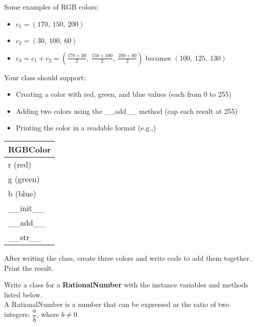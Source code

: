 		\begin{minipage}[t]{0.7\textwidth}
			Some examples of RGB colors:
			\begin{itemize}
				\item $c_1 = (170,\ 150,\ 200)$
				\item $c_2 = (30,\ 100,\ 60)$
				\item $c_3 = c_1 + c_2 = (\frac{170+30}{2},\ \frac{150+100}{2},\ \frac{200+60}{2})$ 
					becomes $(100,\ 125,\ 130)$
			\end{itemize}
		
			Your class should support:
			\begin{itemize}
				\item Creating a color with red, green, and blue values (each from 0 to 255)
				\item Adding two colors using the \_\_add\_\_ method (cap each result at 255)
				\item Printing the color in a readable format (e.g.,)
			\end{itemize}
		\end{minipage}
		\hfill
		\begin{minipage}[t]{0.25\textwidth}
			\vspace{.2em}
			\begin{flushright}
				\begin{tabular}{|l|}
					\hline
					RGBColor \\ \hline
					r (red) \\
					g (green) \\
					b (blue) \\ \hline
					\_\_init\_\_ \\
					\_\_add\_\_ \\
					\_\_str\_\_ \\ \hline
				\end{tabular}
			\end{flushright}
		\end{minipage}
		
		After writing the class, create three colors and write code to add them together.
		Print the result.

	

	\item
		Write a class for a \textbf{RationalNumber} with the instance variables and methods 
		listed below.\\
		A RationalNumber is a number that can be expressed as the ratio of two integers: 
		$\dfrac{a}{b}$, where $b \ne 0$.

